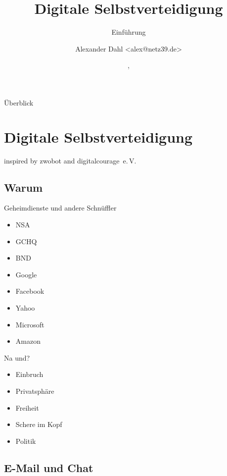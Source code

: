 \documentclass{beamer}
\title{Digitale Selbstverteidigung}
\subtitle{Einführung}
\author{Alexander Dahl <alex@netz39.de>}
\institute{Netz39 e.\,V.}
\date{\gitAuthorDate, \gitAbbrevHash}
\begin{document}
\begin{frame}
	\titlepage
\end{frame}

\logo{
    
}

\begin{frame}{Überblick}
    \tableofcontents
\end{frame}

\section{Digitale Selbstverteidigung}

\begin{frame}
    inspired by zwobot and digitalcourage~e.\,V.
\end{frame}

\subsection{Warum}

\begin{frame}{Geheimdienste und andere Schnüffler}
    \begin{itemize}
        \item NSA
        \item GCHQ
        \item BND
        \pause
        \item Google
        \item Facebook
        \item Yahoo
        \item Microsoft
        \item Amazon
    \end{itemize}
\end{frame}

\begin{frame}{Na und?}
    \begin{itemize}
        \item Einbruch
        \item Privatsphäre
        \item Freiheit
        \item Schere im Kopf
        \item Politik
    \end{itemize}
\end{frame}

\subsection{E-Mail und Chat}
\end{document}
